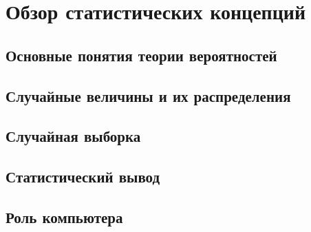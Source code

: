 \chapter{Обзор статистических концепций}

\section{Основные понятия теории вероятностей}

\section{Случайные величины и их распределения}

\section{Случайная выборка}

\section{Статистический вывод}

\section{Роль компьютера}

